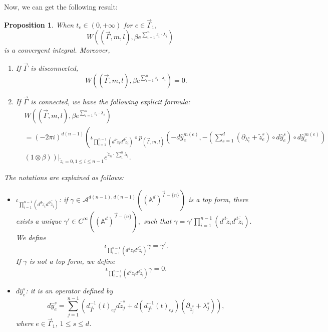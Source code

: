 \documentclass[11pt]{amsart}
\newtheorem{prop}[thm]{Proposition}
\theoremstyle{definition}
\theoremstyle{remark}
\numberwithin{equation}{section}
\begin{document}
Now, we can get the following result:
\begin{prop}\label{explicit formula}
    When $t_{e}\in(0,+\infty)$ for $e\in\vec{\Gamma}_{1}$,
    $$
    W((\vec{\Gamma},m,l),\beta e^{\sum_{i=1}^{n}z_{i}\cdot\lambda_{i}})
    $$
    is a convergent integral. Moreover,
    \begin{enumerate}
        \item If $\vec{\Gamma}$ is disconnected,
        $$
        W((\vec{\Gamma},m,l),\beta e^{\sum_{i=1}^{n}z_{i}\cdot\lambda_{i}})=0.
        $$
        \item If $\vec{\Gamma}$ is connected, we have the following explicit formula:
        \begin{align*}
            &W((\vec{\Gamma},m,l),\beta e^{\sum_{i=1}^{n}z_{i}\cdot\lambda_{i}})\\
            &=(-2\pi i)^{d(n-1)}\left(
        \iota_{\prod_{i=1}^{n-1}(d^{d}\tilde{z}_{i}d^{d}\bar{\tilde{z}}_{i})}\circ p_{(\vec{\Gamma},m,l)}(-d\hat{y}_{e}^{m(e)},-(\sum_{s=1}^{d}(\partial_{\lambda_{e}^{s}}+\tilde{z}_{e}^{s})\circ d\hat{y}_{e}^{s})\circ d\hat{y}_{e}^{m(e)})
        \right.\\
        &\left.\left.(1\otimes \beta)\right)\right|_{\tilde{z}_{i}=0,1\leq i\leq n-1} e^{\tilde{z}_{n}\cdot\sum_{1}^{n}\lambda_{i}}.
        \end{align*}
    \end{enumerate}
    The notations are explained as follows:
    \begin{itemize}
        \item $\iota_{\prod_{i=1}^{n-1}(d^{d}\tilde{z}_{i}d^{d}\bar{\tilde{z}}_{i})}$: if $
        \gamma\in \mathcal{A}^{d(n-1),d(n-1)}((\mathbb{A}^d)^{\vec{I}-\{n\}})
        $ is a top form, there exists a unique
        $
        \gamma'\in C^{\infty}((\mathbb{A}^d)^{\vec{I}-\{n\}}),
        $
        such that
        $
        \gamma=\gamma'\prod_{i=1}^{n-1}(d^{d}\tilde{z}_{i}d^{d}\bar{\tilde{z}}_{i}).
        $
        We define 
        $$
        \iota_{\prod_{i=1}^{n-1}(d^{d}\tilde{z}_{i}d^{d}\bar{\tilde{z}}_{i})}\gamma=\gamma'.
        $$
        If $\gamma$ is not a top form, we define
        $$
        \iota_{\prod_{i=1}^{n-1}(d^{d}\tilde{z}_{i}d^{d}\bar{\tilde{z}}_{i})}\gamma=0.
        $$
        \item $d\hat{y}_{e}^{s}$: it is an operator defined by
        $$
        d\hat{y}_{e}^{s}=\sum_{j=1}^{n-1}\left(d^{-1}_{\vec{\Gamma}}(t)_{ej}d\bar{\tilde{z}}_{j}^{s}+d(d^{-1}_{\vec{\Gamma}}(t)_{ej})(\partial_{\tilde{z}_{j}^{s}}+\lambda_{j}^{s})\right),
        $$
        where $e\in \vec{\Gamma}_{1}$, $1\leq s\leq d$.
    \end{itemize}
\end{prop}
\end{document}
